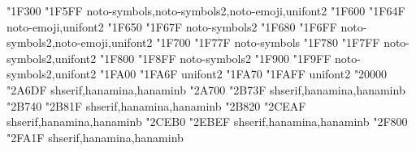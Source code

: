 \documentclass{article}
\begin{document}
          { "1F300} { "1F5FF} {noto-symbols,noto-symbols2,noto-emoji,unifont2}
                                      { "1F600} { "1F64F} {noto-emoji,unifont2}
                            { "1F650} { "1F67F} {noto-symbols2}
                      { "1F680} { "1F6FF} {noto-symbols2,noto-emoji,unifont2}
                             { "1F700} { "1F77F} {noto-symbols}
                      { "1F780} { "1F7FF} {noto-symbols2,unifont2}
                          { "1F800} { "1F8FF} {noto-symbols2}
           { "1F900} { "1F9FF} {noto-symbols2,unifont2}
                                  { "1FA00} { "1FA6F} {unifont2}
             { "1FA70} { "1FAFF} {unifont2}
             { "20000} { "2A6DF} {shserif,hanamina,hanaminb}
             { "2A700} { "2B73F} {shserif,hanamina,hanaminb}
             { "2B740} { "2B81F} {shserif,hanamina,hanaminb}
             { "2B820} { "2CEAF} {shserif,hanamina,hanaminb}
             { "2CEB0} { "2EBEF} {shserif,hanamina,hanaminb}
        { "2F800} { "2FA1F} {shserif,hanamina,hanaminb}
\end{document}
